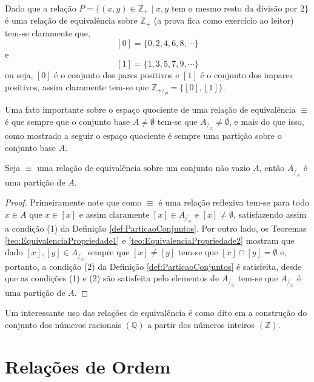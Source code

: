 \begin{example}
	Dado que a relação $P = \{(x,y) \in \mathbb{Z}_+ \mid x, y\text{ tem o mesmo resto da divisão por } 2\}$ é uma relação de equivalência sobre $\mathbb{Z}_+$ (a prova fica como exercício ao leitor) tem-se claramente que, 
	$$[0] = \{0, 2, 4, 6, 8, \cdots\}$$
	e
	$$[1] = \{1, 3, 5, 7, 9, \cdots\}$$
	ou seja, $[0]$ é o conjunto dos pares positivos e $[1]$ é o conjunto dos impares positivos, assim claramente tem-se que $\mathbb{Z}_{+/_P} = \{[0], [1]\}$.
\end{example}

Uma fato importante sobre o espaço quociente de uma relação de equivalência $\equiv$ é que sempre que o conjunto base $A \neq \emptyset$ tem-se que $A_{/_\equiv} \neq \emptyset$, e mais do que isso, como mostrado a seguir o espaço quociente é sempre uma partição sobre o conjunto base $A$.

\begin{theorem}
	Seja $\equiv$ uma relação de equivalência sobre um conjunto não vazio $A$, então $A_{/_\equiv}$ é uma partição de $A$.
\end{theorem}

\begin{proof}
	Primeiramente note que como $\equiv$ é uma relação reflexiva tem-se para todo $x \in A$ que $x \in [x]$ e assim claramente $[x] \in A_{/_\equiv}$ e $[x] \neq \emptyset$, satisfazendo assim a condição (1) da Definição \ref{def:ParticaoConjuntos}. Por outro lado, os Teoremas \ref{teo:EquivalenciaPropriedade1} e \ref{teo:EquivalenciaPropriedade2} mostram que dado $[x], [y] \in A_{/_\equiv}$ sempre que $[x] \neq [y]$ tem-se que  $[x] \cap [y] = \emptyset$ e, portanto, a condição (2) da Definição \ref{def:ParticaoConjuntos} é satisfeita, desde que as condições (1) e (2) são satisfeita pelo elementos de $A_{/_\equiv}$ tem-se que $A_{/_\equiv}$ é uma partição de $A$.
\end{proof}

Um interessante uso das relações de equivalência é como dito em \cite{carmo2013} a construção do conjunto dos números racionais $(\mathbb{Q})$ a partir dos números inteiros $(\mathbb{Z})$.


\section{Relações de Ordem}\label{sec:Ordem}

